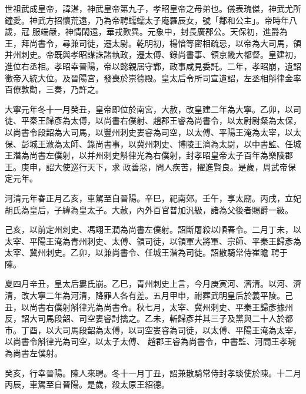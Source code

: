 
\begin{pinyinscope}

 世祖武成皇帝，諱湛，神武皇帝第九子，孝昭皇帝之母弟也。儀表瑰傑，神武尤所鐘愛。神武方招懷荒遠，乃為帝聘蠕蠕太子庵羅辰女，號「鄰和公主」。帝時年八歲，冠
 服端嚴，神情閑遠，華戎歎異。元象中，封長廣郡公。天保初，進爵為王，拜尚書令，尋兼司徒，遷太尉。乾明初，楊愔等密相疏忌，以帝為大司馬，領并州刺史。帝既與孝昭謀誅諸執政，遷太傅、錄尚書事、領京畿大都督。皇建初，進位右丞相。孝昭幸晉陽，帝以懿親居守鄴，政事咸見委託。二年，孝昭崩，遺詔徵帝入統大位。及晉陽宮，發喪於崇德殿。皇太后令所司宣遺詔，左丞相斛律金率百僚敦勸，三奏，乃許之。



 大寧元年冬十一月癸丑，皇帝即位於南宮，大赦，改皇建二年為大寧。乙卯，以司徒、平秦王歸彥為太傅，以尚書右僕射、趙郡王睿為尚書令，以太尉尉粲為太保，以尚書令段韶為大司馬，以豐州刺史婁睿為司空，以太傅、平陽王淹為太宰，以太保、彭城王浟為太師、錄尚書事，以冀州刺史、博陵王濟為太尉，以中書監、任城王潛為尚書左僕射，以并州刺史斛律光為右僕射，封孝昭皇帝太子百年為樂陵郡王。庚申，詔大使巡行天下，求
 政善惡，問人疾苦，擢進賢良。是歲，周武帝保定元年。



 河清元年春正月乙亥，車駕至自晉陽。辛巳，祀南郊。壬午，享太廟。丙戌，立妃胡氏為皇后，子緯為皇太子。大赦，內外百官普加汎級，諸為父後者賜爵一級。



 己亥，以前定州刺史、馮翊王潤為尚書左僕射。詔斷屠殺以順春令。二月丁未，以太宰、平陽王淹為青州刺史、太傅、領司徒，以領軍大將軍、宗師、平秦王歸彥為太宰、冀州刺史。乙卯，以兼尚書令、任城王湝為司徒。詔散騎常侍崔瞻
 聘于陳。



 夏四月辛丑，皇太后婁氏崩。乙巳，青州刺史上言，今月庚寅河、濟清。以河、濟清，改大寧二年為河清，降罪人各有差。五月甲申，祔葬武明皇后於義平陵。己丑，以尚書右僕射斛律光為尚書令。秋七月，太宰、冀州刺史、平秦王歸彥據州反，詔大司馬段韶、司空婁睿討擒之。乙未，斬歸彥并其三子及黨與二十人於都市。丁酉，以大司馬段韶為太傅，以司空婁睿為司徒，以太傅、平陽王淹為太宰，以尚書令斛律光為司空，以太子太傅、
 趙郡王睿為尚書令，中書監、河間王孝琬為尚書左僕射。



 癸亥，行幸晉陽。陳人來聘。冬十一月丁丑，詔兼散騎常侍封孝琰使於陳。十二月丙辰，車駕至自晉陽。是歲，殺太原王紹德。




\end{pinyinscope}
